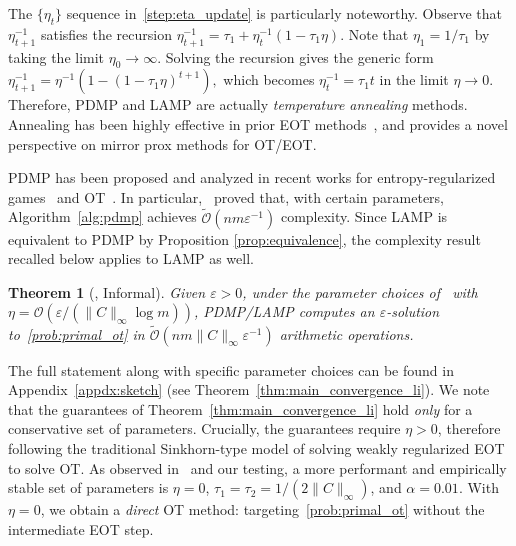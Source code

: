 \documentclass[10pt]{article}
\renewcommand{\O}{\mathcal{O}}
\newcommand{\tO}{\widetilde{\O}}
\theoremstyle{plain}
\newtheorem{theorem}{Theorem}[section]
\theoremstyle{definition}
\theoremstyle{remark}
\begin{document}
The $\{\eta_t\}$ sequence in~\eqref{step:eta_update} is particularly noteworthy. Observe that $\eta_{t+1}^{-1}$ satisfies the recursion $\eta_{t+1}^{-1}=\tau_1+\eta_{t}^{-1}(1-\tau_1\eta )$. Note that $\eta_1 =1/\tau_1$ by taking the limit $\eta_0\to\infty$. Solving the recursion gives the generic form
$
    \eta_{t+1}^{-1}={\eta }^{-1}(1-(1-\tau_1\eta )^{t+1}),
$
which becomes $\eta_{t}^{-1}=\tau_1t$ in the limit $\eta \to0$. Therefore, PDMP and LAMP are actually \emph{temperature annealing} methods. Annealing has been highly effective in prior EOT methods~\cite{schmitzerStabilizedSparseScaling2019a,kemertasEfficientAccurateOptimal2025}, and provides a novel perspective on mirror prox methods for OT/EOT.

PDMP has been proposed and analyzed in recent works for entropy-regularized games~\cite{cen2024fast} and OT~\cite{liFastComputationOptimal2025}. In particular,~\cite{liFastComputationOptimal2025} proved that, with certain parameters, Algorithm~\ref{alg:pdmp} achieves $\tO(nm\varepsilon^{-1})$ complexity. Since LAMP is equivalent to PDMP by Proposition \ref{prop:equivalence}, the complexity result recalled below applies to LAMP as well.


\begin{theorem}[{\cite[Theorem 2.2]{liFastComputationOptimal2025}, Informal}]\label{thm:li_informal}
Given $\varepsilon>0$, under the
parameter choices of~\cite{liFastComputationOptimal2025} with $\eta=\mathcal{O}(\varepsilon/(\|C\|_\infty\log m))$, PDMP/LAMP computes
an $\varepsilon$-solution to~\eqref{prob:primal_ot} in
$
\tO(nm\|C\|_\infty\varepsilon^{-1})
$
arithmetic operations.
\end{theorem}

The full statement along with specific parameter choices can be found in Appendix~\ref{appdx:sketch} (see Theorem~\ref{thm:main_convergence_li}). We note that the guarantees of Theorem~\ref{thm:main_convergence_li} hold \textit{only} for a conservative set of parameters. Crucially, the guarantees require $\eta>0$, therefore following the traditional Sinkhorn-type model of solving weakly regularized EOT to solve OT. As observed in~\cite{liFastComputationOptimal2025} and our testing, a more performant and empirically stable set of parameters is $\eta =0$, $\tau_1=\tau_2=1/(2\|C\|_\infty)$, and $\alpha=0.01$. With $\eta=0$, we obtain a \textit{direct} OT method: targeting~\eqref{prob:primal_ot} without the intermediate EOT step. 
\end{document}
